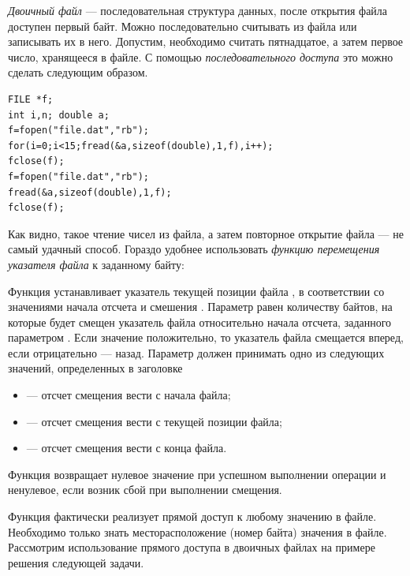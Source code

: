 \emph{Двоичный файл }--- последовательная структура данных, после открытия файла доступен первый байт. Можно
последовательно считывать из файла или записывать их в него. Допустим, необходимо считать пятнадцатое, а затем первое
число, хранящееся в файле. С помощью \emph{последовательного доступа}
это можно сделать следующим образом.
\begin{lstlisting}
FILE *f; 
int i,n; double a;
f=fopen("file.dat","rb");
for(i=0;i<15;fread(&a,sizeof(double),1,f),i++);
fclose(f);
f=fopen("file.dat","rb");
fread(&a,sizeof(double),1,f);
fclose(f);
\end{lstlisting}

Как видно, такое чтение чисел из файла, а затем повторное открытие файла --- не самый удачный способ. Гораздо удобнее
использовать \emph{функцию перемещения указателя файла} к заданному байту:


Функция устанавливает указатель текущей позиции файла , в соответствии со значениями начала отсчета
 и смешения . Параметр  равен количеству
байтов, на которые будет смещен указатель файла относительно начала отсчета, заданного параметром
. Если значение  положительно, то указатель файла смещается вперед,
если отрицательно --- назад. Параметр  должен принимать одно из следующих значений, 
определенных в заголовке 
\begin{itemize}
\item[]  --- отсчет смещения  вести с начала файла;
\item[]  --- отсчет смещения  вести с текущей позиции файла;
\item[]  --- отсчет смещения  вести с конца файла.
\end{itemize}
Функция возвращает нулевое значение при успешном выполнении операции и ненулевое, если возник сбой при выполнении
смещения.

Функция  фактически реализует прямой доступ к любому значению в файле. Необходимо только знать
месторасположение (номер байта) значения в файле. Рассмотрим использование прямого доступа в двоичных файлах на примере
решения следующей задачи.


